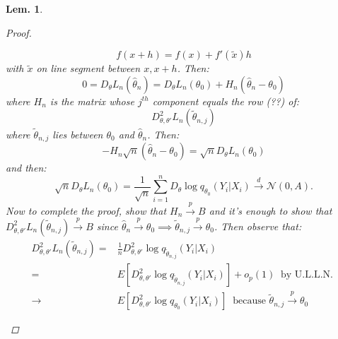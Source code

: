 \documentclass{tufte-book}
\theoremstyle{mytheoremstyle}
\theoremstyle{mylemstyle}
\newtheorem*{lem}{Lem.}
\theoremstyle{mydefstyle}
\begin{document}
\begin{lem}
\begin{proof}
\begin{enumerate}
{		\[ f(x + h) = f(x) + f'(\tilde{x})h\]
	with \(\tilde{x}\) on line segment between \(x, x+h\).} Then:
		\[0 = D_\theta L_n(\hat{\theta}_n) = D_\theta L_n(\theta_0) + H_n(\hat{\theta}_n - \theta_0)\]
	where \(H_n\) is the matrix whose \(j^{th}\) component equals the row (??) of:
		\[D^2_{\theta,\theta'} L_n(\tilde{\theta}_{n,j})\]
	where \(\tilde{\theta}_{n,j}\) lies between \(\theta_0\) and \(\hat{\theta}_n\). Then:
		\[-H_n \sqrt{n}(\hat{\theta}_n - \theta_0) = \sqrt{n} D_\theta L_n(\theta_0)\]
	and then:
		\[\sqrt{n}D_\theta L_n(\theta_0) = \frac{1}{\sqrt{n}} \sum_{i=1}^n D_\theta \log q_{\theta_0} (Y_i | X_i) \overset{d}{\rightarrow} \mathcal{N}(0, A) \text{.}\]
	Now to complete the proof, show that \(H_n \overset{p}{\rightarrow} B\) and it's enough to show that \(D_{\theta, \theta'}^2 L_n (\tilde{\theta}_{n,j}) \overset{p}{\rightarrow} B\) since \(\hat{\theta}_n \overset{p}{\rightarrow} \theta_0 \implies \tilde{\theta}_{n,j} \overset{p}{\rightarrow} \theta_0\). Then observe that:
		\begin{align*}
			D^2_{\theta,\theta'} L_n (\tilde{\theta}_{n,j}) =& \frac{1}{n} D^2_{\theta,\theta'} \log q_{\tilde{\theta}_{n,j}} (Y_i | X_i) \\
											=& E[D_{\theta,\theta'}^2 \log q_{\tilde{\theta}_{n,j}} (Y_i | X_i)] + o_p(1)\ \text{ by U.L.L.N. } \\
											\rightarrow & E[D_{\theta,\theta'}^2 \log q_{\theta_0} (Y_i | X_i)]\ \text{ because } \tilde{\theta}_{n,j} \overset{p}{\rightarrow} \theta_0
		\end{align*}
\end{enumerate}
\end{proof}
\end{lem}
\end{document}
